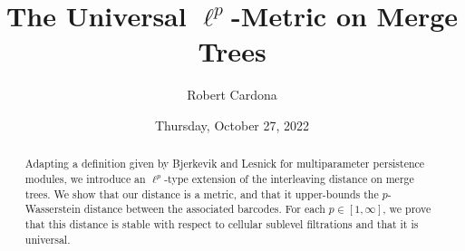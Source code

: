 \documentclass{UAmathtalk}
\author{Robert Cardona}
\title{The Universal $\ell^p$-Metric on Merge Trees}
\date{Thursday, October 27, 2022}
\begin{document}
\maketitle

\begin{abstract}
Adapting a definition given by Bjerkevik and Lesnick for multiparameter persistence modules, we introduce an $\ell^p$-type extension of the interleaving distance on merge trees. We show that our distance is a metric, and that it upper-bounds the $p$-Wasserstein distance between the associated barcodes. For each $p \in [1,\infty]$, we prove that this distance is stable with respect to cellular sublevel filtrations and that it is universal.
\end{abstract}
\end{document}
